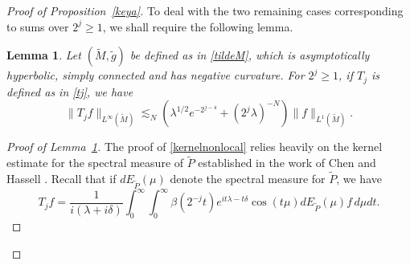 \documentclass[10pt]{amsart}
\newtheorem{lemma}[theorem]{Lemma}
\newcommand{\la}{\lambda}
\newcommand{\one}{{\bf 1}}
\newcommand{\1}{{\bf 1}}
\begin{document}
\begin{proof}[Proof of Proposition~\ref{keya}]




To deal with the two remaining cases corresponding to sums over  $2^j\ge1$,  we shall require the following lemma.
\begin{lemma}\label{kernelhyper}
Let $(\tilde M,\tilde g)$ be defined as in \eqref{tildeM}, which is asymptotically hyperbolic, simply connected and has negative curvature. For $2^j\ge 1$, if $T_j$ is defined as in \eqref{tj}, we have
    \begin{equation}\label{kernelnonlocal}
    \|T_j f\|_{L^\infty(\tilde M)}\lesssim_N (\la^{1/2}e^{-2^{j-4}}+(2^j\la)^{-N} )\|f\|_{L^1(\tilde M)}.
\end{equation}
\end{lemma}
\begin{proof}[Proof of Lemma~\ref{kernelhyper}]
The proof of \eqref{kernelnonlocal} relies heavily on the kernel estimate for the spectral measure of $\tilde P$ established in the work of Chen and Hassell \cite{ChHa}.
Recall that if $dE_{\tilde P}(\mu)$ denote the spectral measure for $\tilde P$, we have
\begin{equation}\label{tja}
T_jf=\frac1{i(\la+i\delta)}\int_0^\infty \int_0^\infty \beta(2^{-j}t)e^{it\la-t\delta}\cos (t\mu) dE_{\tilde P} (\mu) f\, d\mu dt.
\end{equation}



\end{proof}
\end{proof}
\end{document}

